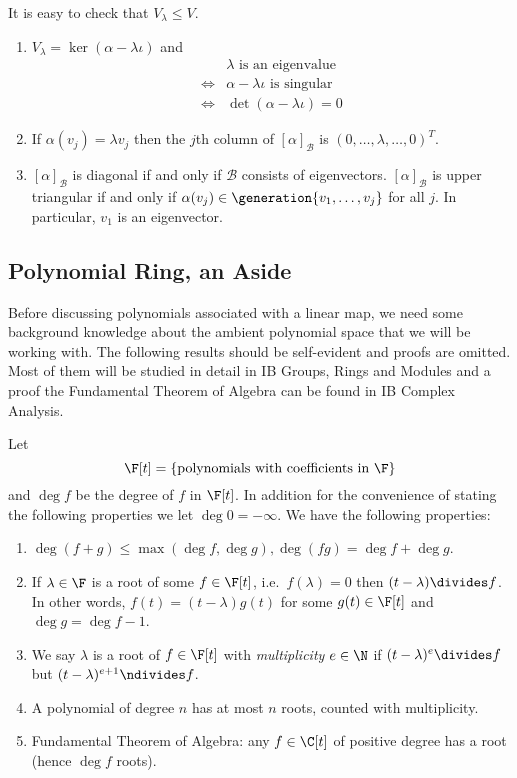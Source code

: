 \documentclass[a4paper]{article}
\newcommand*{\spans}{\generation}
\newcommand*{\basis}{\mathcal}
\theoremstyle{definition}
\begin{document}
\begin{remark}
  It is easy to check that \(V_\lambda \leq V\).
\end{remark}

\begin{remark}\leavevmode
  \begin{enumerate}
  \item \(V_\lambda = \ker(\alpha - \lambda \iota)\) and
    \begin{align*}
      & \lambda \text{ is an eigenvalue} \\
      \Leftrightarrow & \alpha - \lambda \iota \text{ is singular} \\
      \Leftrightarrow & \det (\alpha - \lambda \iota) = 0
    \end{align*}
  \item If \(\alpha(v_j) = \lambda v_j\) then the \(j\)th column of \([\alpha]_{\basis B}\) is \((0, \dots, \lambda, \dots, 0)^T\).
  \item \([\alpha]_{\basis B}\) is diagonal if and only if \(\basis B\) consists of eigenvectors. \([\alpha]_{\basis B}\) is upper triangular if and only if \(\alpha(v_j) \in \spans{v_1, \dots, v_j}\) for all \(j\). In particular, \(v_1\) is an eigenvector.
  \end{enumerate}
\end{remark}

\subsection{Polynomial Ring, an Aside}

Before discussing polynomials associated with a linear map, we need some background knowledge about the ambient polynomial space that we will be working with. The following results should be self-evident and proofs are omitted. Most of them will be studied in detail in IB Groups, Rings and Modules and a proof the Fundamental Theorem of Algebra can be found in IB Complex Analysis.

Let
\[
  \F[t] = \{\text{polynomials with coefficients in } \F\}
\]
and \(\deg f\) be the degree of \(f\) in \(\F[t]\). In addition for the convenience of stating the following properties we let \(\deg 0 = -\infty\). We have the following properties:
\begin{enumerate}
\item \(\deg (f + g) \leq \max(\deg f, \deg g), \deg(f g) = \deg f + \deg g\).
\item If \(\lambda \in \F\) is a root of some \(f \in \F[t]\), i.e.\ \(f(\lambda) = 0\) then \((t - \lambda) \divides f\). In other words, \(f(t) = (t - \lambda) g(t)\) for some \(g(t) \in \F[t]\) and \(\deg g = \deg f - 1\).
\item We say \(\lambda\) is a root of \(f \in \F[t]\) with \emph{multiplicity} \(e \in \N\) if \((t - \lambda)^e \divides f\) but \((t - \lambda)^{e + 1} \ndivides f\).
\item A polynomial of degree \(n\) has at most \(n\) roots, counted with multiplicity.
\item Fundamental Theorem of Algebra: any \(f \in \C[t]\) of positive degree has a root (hence \(\deg f\) roots).
\end{enumerate}
\end{document}
